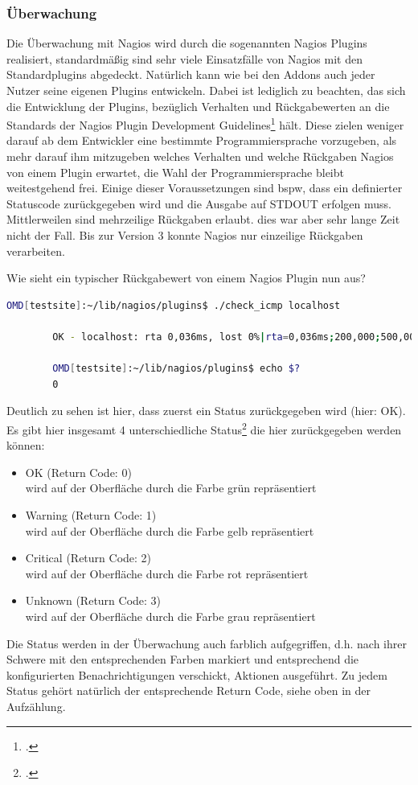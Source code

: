 \documentclass[12pt,a4paper,parskip,listof=totoc,bibliography=totoc]{scrreprt}
\begin{document}
	\subsubsection{Überwachung}
	Die Überwachung mit Nagios wird durch die sogenannten Nagios Plugins realisiert, standardmäßig sind sehr viele Einsatzfälle von Nagios mit den Standardplugins abgedeckt. Natürlich kann wie bei den Addons auch jeder Nutzer seine eigenen Plugins entwickeln. Dabei ist lediglich zu beachten, das sich die Entwicklung der Plugins, bezüglich Verhalten und Rückgabewerten an die Standards der \glqq Nagios Plugin Development Guidelines\grqq\footcite{nagiospluginguidelines} hält. Diese zielen weniger darauf ab dem Entwickler eine bestimmte Programmiersprache vorzugeben, als mehr darauf ihm mitzugeben welches Verhalten und welche Rückgaben Nagios von einem Plugin erwartet, die Wahl der Programmiersprache bleibt weitestgehend frei. Einige dieser Voraussetzungen sind \acrlong{bspw}, dass ein definierter Statuscode zurückgegeben wird und die Ausgabe auf STDOUT erfolgen muss. Mittlerweilen sind mehrzeilige Rückgaben erlaubt. dies war aber sehr lange Zeit nicht der Fall. Bis zur Version 3 konnte Nagios nur einzeilige Rückgaben verarbeiten.
	
	Wie sieht ein typischer Rückgabewert von einem Nagios Plugin nun aus? \medskip
	
	\begin{lstlisting}[language=bash, caption=Rückgabe eines ICMP Checks, showlines=false, breaklines=true,numberblanklines=false, label=lst:icmpcheck]
		OMD[testsite]:~/lib/nagios/plugins$ ./check_icmp localhost
		
		OK - localhost: rta 0,036ms, lost 0%|rta=0,036ms;200,000;500,000;0; pl=0%;40;80;; rtmax=0,086ms;;;; rtmin=0,022ms;;;; 
		
		OMD[testsite]:~/lib/nagios/plugins$ echo $?
		0	\end{lstlisting}
	Deutlich zu sehen ist hier, dass zuerst ein Status zurückgegeben wird (hier: OK). Es gibt hier insgesamt 4 unterschiedliche Status\footcite[Plugin Return Codes]{nagiospluginguidelines} die hier zurückgegeben werden können:
	\begin{itemize}
		\item OK (Return Code: 0)\\
		wird auf der Oberfläche durch die Farbe grün repräsentiert
		\item Warning (Return Code: 1)\\
		wird auf der Oberfläche durch die Farbe gelb repräsentiert
		\item Critical (Return Code: 2)\\
		wird auf der Oberfläche durch die Farbe rot repräsentiert
		\item Unknown (Return Code: 3)\\
		wird auf der Oberfläche durch die Farbe grau repräsentiert
	\end{itemize}
	Die Status werden in der Überwachung auch farblich aufgegriffen, d.h. nach ihrer Schwere mit den entsprechenden Farben markiert und entsprechend die konfigurierten Benachrichtigungen verschickt, Aktionen ausgeführt. Zu jedem Status gehört natürlich der entsprechende Return Code, siehe oben in der Aufzählung.
	
\end{document}
